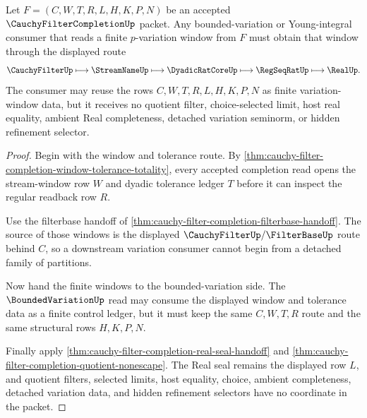 \begin{theorem}
\label{thm:cauchy-filter-completion-pvariation-window-bound}
Let $F=(C,W,T,R,L,H,K,P,N)$ be an accepted $\CauchyFilterCompletionUp$ packet. Any bounded-variation or Young-integral consumer that reads a finite $p$-variation window from $F$ must obtain that window through the displayed route
$$
\CauchyFilterUp \longmapsto \StreamNameUp \longmapsto \DyadicRatCoreUp \longmapsto \RegSeqRatUp \longmapsto \RealUp .
$$
The consumer may reuse the rows $C,W,T,R,L,H,K,P,N$ as finite variation-window data, but it receives no quotient filter, choice-selected limit, host real equality, ambient Real completeness, detached variation seminorm, or hidden refinement selector.
\end{theorem}
\begin{proof}
Begin with the window and tolerance route. By \autoref{thm:cauchy-filter-completion-window-tolerance-totality}, every accepted completion read opens the stream-window row $W$ and dyadic tolerance ledger $T$ before it can inspect the regular readback row $R$.

Use the filterbase handoff of \autoref{thm:cauchy-filter-completion-filterbase-handoff}. The source of those windows is the displayed $\CauchyFilterUp/\FilterBaseUp$ route behind $C$, so a downstream variation consumer cannot begin from a detached family of partitions.

Now hand the finite windows to the bounded-variation side. The $\BoundedVariationUp$ read may consume the displayed window and tolerance data as a finite control ledger, but it must keep the same $C,W,T,R$ route and the same structural rows $H,K,P,N$.

Finally apply \autoref{thm:cauchy-filter-completion-real-seal-handoff} and \autoref{thm:cauchy-filter-completion-quotient-nonescape}. The Real seal remains the displayed row $L$, and quotient filters, selected limits, host equality, choice, ambient completeness, detached variation data, and hidden refinement selectors have no coordinate in the packet.
\end{proof}

